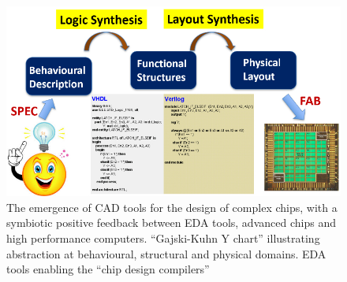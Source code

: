 \begin{figure}[H]
\includegraphics[scale=1.3]{src/Figures/chap1/chap1-fig04d.jpg}
\caption{The emergence of CAD tools for the design of complex chips, with a symbiotic positive feedback between EDA tools, advanced chips and high performance computers.  “Gajski-Kuhn Y chart” illustrating abstraction at behavioural, structural and physical domains. EDA tools enabling the “chip design compilers”}\label{chap1-fig4}
\end{figure}

\vfill\eject


